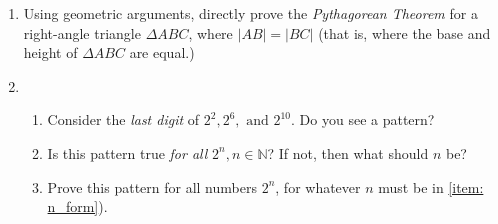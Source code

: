 \begin{enumerate}
			\item \challenge Using geometric arguments, directly prove the \emph{Pythagorean Theorem} for a right-angle triangle $\Delta ABC$, where $|AB|=|BC|$ (that is, where the base and height of $\Delta ABC$ are equal.)
			\item \challenge
				\begin{enumerate}
					\item Consider the \emph{last digit} of $2^2, 2^6, \text{ and } 2^{10}$. Do you see a pattern?
					\item Is this pattern true \emph{for all} $2^n, n\in\mathbb{N}$? If not, then what should $n$ be? \label{item: n_form}
					\item Prove this pattern for all numbers $2^n$, for whatever $n$ must be in \ref{item: n_form}).
				\end{enumerate}

		\end{enumerate}
